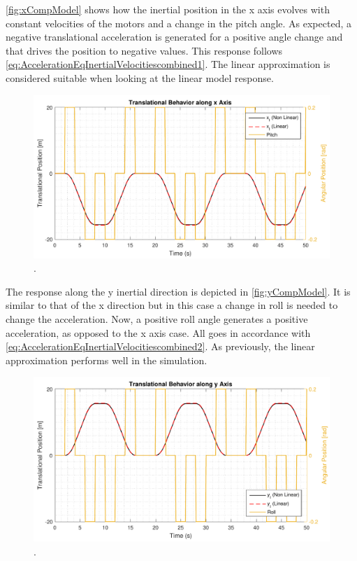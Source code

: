 \autoref{fig:xCompModel} shows how the inertial position in the x axis evolves with constant velocities of the motors and a change in the pitch angle. As expected, a negative translational acceleration is generated for a positive angle change and that drives the position to negative values. This response follows \autoref{eq:AccelerationEqInertialVelocitiescombined1}. The linear approximation is considered suitable when looking at the linear model response.
\begin{figure}[H]
	\centering
	\includegraphics[scale=0.65]{figures/xCompModel}
	\caption{.}
	\label{fig:xCompModel}
\end{figure}
The response along the y inertial direction is depicted in \autoref{fig:yCompModel}. It is similar to that of the x direction but in this case a change in roll is needed to change the acceleration. Now, a positive roll angle generates a positive acceleration, as opposed to the x axis case. All goes in accordance with \autoref{eq:AccelerationEqInertialVelocitiescombined2}. As previously, the linear approximation performs well in the simulation.
\begin{figure}[H]
	\centering
	\includegraphics[scale=0.65]{figures/yCompModel}
	\caption{.}
	\label{fig:yCompModel}
\end{figure}
